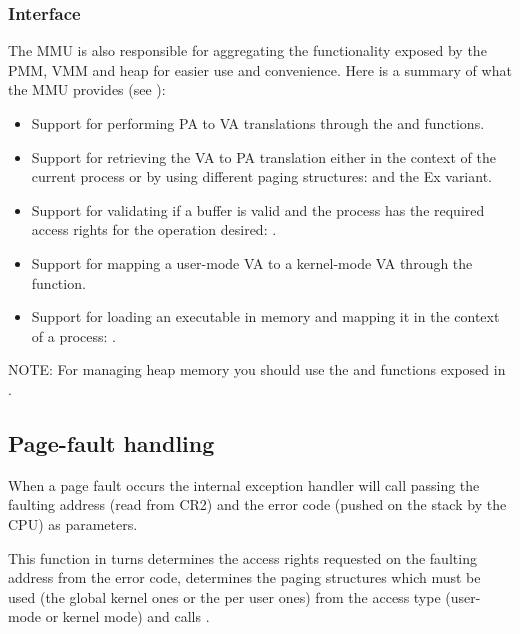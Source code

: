\begin{appendices}
\subsubsection{Interface}
The MMU is also responsible for aggregating the functionality exposed by the PMM, VMM and heap for
easier use and convenience. Here is a summary of what the MMU provides (see ):
\begin{itemize}
	\item Support for performing PA to VA translations through the  and
 functions.

	\item Support for retrieving the VA to PA translation either in the context of the current
process or by using different paging structures:  and the Ex variant.

	\item Support for validating if a buffer is valid and the process has the required access rights
for the operation desired: .

	\item Support for mapping a user-mode VA to a kernel-mode VA through the 
 function.

	\item Support for loading an executable in memory and mapping it in the context of a process:
.
\end{itemize}

NOTE: For managing heap memory you should use the  and 
 functions exposed in .

\subsection{Page-fault handling}
\label{sect:PfHandling}

When a page fault occurs the internal exception handler will call  passing
the faulting address (read from CR2) and the error code (pushed on the stack by the CPU) as
parameters.

This function in turns determines the access rights requested on the faulting address from the error
code, determines the paging structures which must be used (the global kernel ones or the per user
ones) from the access type (user-mode or kernel mode) and calls .


\end{appendices}
